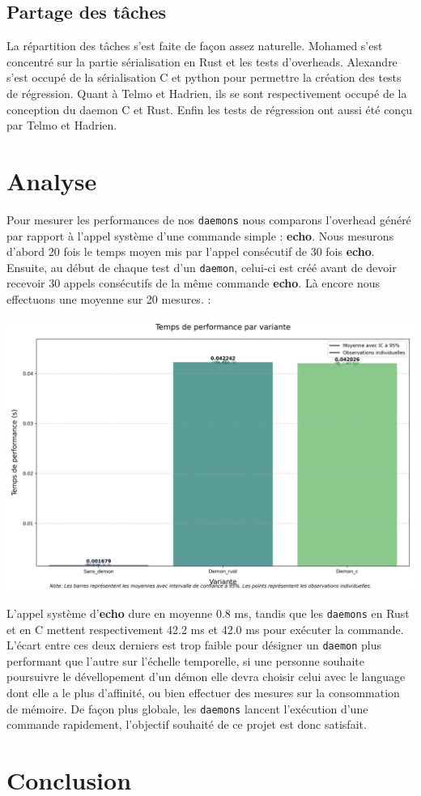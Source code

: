 \documentclass{article}
\begin{document}
\subsection{Partage des tâches}

La répartition des tâches s'est faite de façon assez naturelle. Mohamed s'est concentré sur la partie sérialisation en Rust et les tests d'overheads. Alexandre s'est occupé de la sérialisation C et python pour permettre la création des tests de régression. Quant à Telmo et Hadrien, ils se sont respectivement occupé de la conception du daemon C et Rust. Enfin les tests de régression ont aussi été conçu par Telmo et Hadrien.  


\section{Analyse}
\label{sec:analyse}
Pour mesurer les performances de nos \texttt{daemons} nous comparons l'overhead généré par rapport à l'appel système d'une commande simple : \textbf{echo}.
Nous mesurons d'abord 20 fois le temps moyen mis par l'appel consécutif de 30 fois \textbf{echo}. Ensuite, au début de chaque test d'un \texttt{daemon}, celui-ci est créé avant de devoir recevoir 30 appels consécutifs de la même commande \textbf{echo}. Là encore nous effectuons une moyenne sur 20 mesures. :


\centerline{\includegraphics[scale=0.4]{performance_comparison}}

L'appel système d'\textbf{echo} dure en moyenne 0.8 ms, tandis que les \texttt{daemons} en Rust et en C mettent respectivement 42.2 ms et 42.0 ms pour exécuter la commande. L'écart entre ces deux derniers est trop faible pour désigner un \texttt{daemon} plus performant que l'autre sur l'échelle temporelle, si une personne souhaite poursuivre le dévellopement d'un démon elle devra choisir celui avec le language dont elle a le plus d'affinité, ou bien effectuer des mesures sur la consommation de mémoire. De façon plus globale, les \texttt{daemons} lancent l'exécution d'une commande rapidement, l'objectif souhaité de ce projet est donc satisfait. 



\section{Conclusion}
\end{document}
